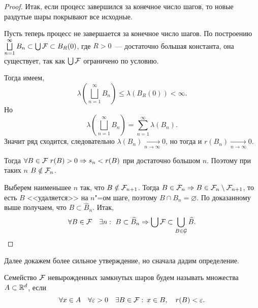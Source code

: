 \begin{lemma}[Витали]
\begin{proof}
        Итак, если процесс завершился за конечное число шагов, то новые раздутые шары покрывают все исходные.

        Пусть теперь процесс не завершается за конечное число шагов.
        По построению $\bigsqcup\limits_{n=1}^{\infty}B_n\subset \bigcup\mathcal{F} \subset B_{R}(0)$, где
        $R>0$~--- достаточно большая константа, она существует, так как $\bigcup\mathcal{F} $ ограничено по условию.

        Тогда имеем,
        \[
            \lambda\left(\bigsqcup_{n=1}^{\infty}B_n\right)\leqslant\lambda(B_{R}(0))<\infty.
        \]
        Но
        \[
            \lambda\left(\bigsqcup_{n=1}^{\infty}B_n\right)=
            \sum_{n=1}^{\infty}\lambda(B_n).
        \]
        Значит ряд сходится, следовательно $\lambda(B_n)\xrightarrow[n\to\infty]{}0$, но тогда
        и $r(B_n)\xrightarrow[n\to\infty]{}0$.

        Тогда $\forall B\in\mathcal{F} \ r(B)>0\Rightarrow s_n<r(B)$ при достаточно большом $n$. Поэтому при таких $n$
        $B\notin\mathcal{F} _n$.

        Выберем наименьшее $n$ так, что $B\notin\mathcal{F} _{n+1}$.
        Тогда $B\in\mathcal{F} _n\Rightarrow B\in\mathcal{F} _n\setminus\mathcal{F} _{n+1}$, то есть $B$ <<удаляется>> на
        $n$"=ом шаге, поэтому $B\cap B_n=\varnothing$. По доказанному выше получаем, что
        $B\subset \widehat{B}_n$. Итак,
        \[
            \forall B\in\F\quad\exists n:\ B\subset \widehat{B}_n\Rightarrow\bigcup\F\subset
            \bigcup_{B\in\CG}\widehat{B}.
        \]

    \end{proof}
\end{lemma}

Далее докажем более сильное утверждение, но сначала дадим определение.
\begin{definition}
    Семейство $\mathcal{F} $ невырожденных замкнутых шаров будем называть 
    множества $A\subset\mathbb{R}^d$, если \[
        \forall x\in A\quad \forall\varepsilon>0\quad \exists B\in\mathcal{F} :\: x\in B
        ,\quad r(B)<\varepsilon.
    \]
\end{definition}

